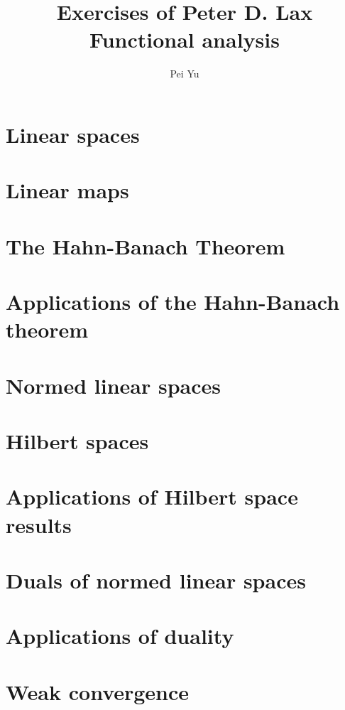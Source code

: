 \documentclass[11pt]{elegantbook}
\title{Exercises of Peter D. Lax Functional analysis}
\author{Pei Yu}
\begin{document}
\maketitle

\frontmatter
\tableofcontents

\mainmatter

\chapter{Linear spaces}



\chapter{Linear maps}

\chapter{The Hahn-Banach Theorem}

\chapter{Applications of the Hahn-Banach theorem}

\chapter{Normed linear spaces}

\chapter{Hilbert spaces}

\chapter{Applications of Hilbert space results}

\chapter{Duals of normed linear spaces}

\chapter{Applications of duality}

\chapter{Weak convergence}
\end{document}
